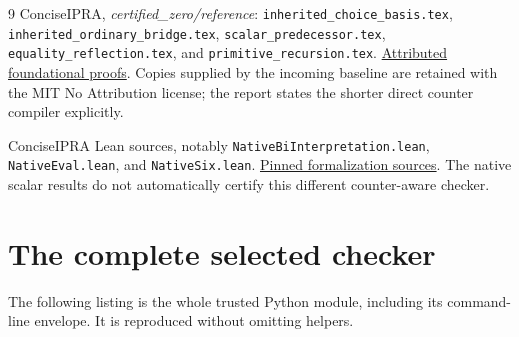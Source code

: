 \documentclass[10pt,letterpaper]{article}
\theoremstyle{definition}
\theoremstyle{remark}
\begin{document}
\begin{thebibliography}{9}
ConciseIPRA, \emph{certified\_zero/reference}:
\texttt{inherited\_choice\_basis.tex},
\texttt{inherited\_ordinary\_bridge.tex},
\texttt{scalar\_predecessor.tex},
\texttt{equality\_reflection.tex},
and \texttt{primitive\_recursion.tex}.
\href{https://github.com/VladimirReshetnikov/ProveIt/tree/0ebd0c6b358f38bb0ad2883faf775421599c8aae/Logic/PrimitiveRecursiveArithmetic/ConciseIPRA/Research/certified_zero/reference}{Attributed foundational proofs}.
Copies supplied by the incoming baseline are retained with the MIT No
Attribution license; the report states the shorter direct counter
compiler explicitly.

ConciseIPRA Lean sources, notably
\texttt{NativeBiInterpretation.lean},
\texttt{NativeEval.lean}, and \texttt{NativeSix.lean}.
\href{https://github.com/VladimirReshetnikov/ProveIt/tree/0ebd0c6b358f38bb0ad2883faf775421599c8aae/Logic/PrimitiveRecursiveArithmetic/ConciseIPRA/Lean/ConciseIPRA}{Pinned formalization sources}.
The native scalar results do not automatically certify this different
counter-aware checker.
\end{thebibliography}

\appendix
\section{The complete selected checker}
The following listing is the whole trusted Python module, including its
command-line envelope. It is reproduced without omitting helpers.
\end{document}

